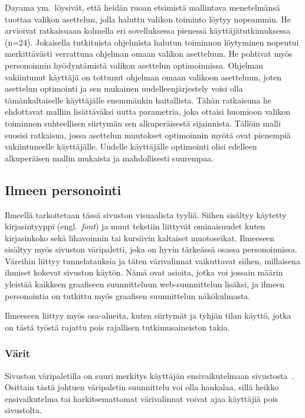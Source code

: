\documentclass[finnish, 12pt, a4paper, elec, utf8, a-1b, online]{aaltothesis}
\begin{document}
Dayama ym.~löysivät, että heidän ruoan etsimistä mallintava menetelmänsä tuottaa
valikon asettelun, jolla haluttu valikon toiminto löytyy nopeammin. He arvioivat
ratkaisuaan kolmella eri sovelluksessa pienessä käyttäjätutkimuksessa (n=24).
Jokaisella tutkituista ohjelmista halutun toiminnon löytyminen nopeutui
merkittävästi verrattuna ohjelman omaan valikon asetteluun. He pohtivat myös
personoinnin hyödyntämistä valikon asettelun optimoinnissa. Ohjelman vakiintunut
käyttäjä on tottunut ohjelman omaan valikoon asetteluun, joten asettelun
optimointi ja sen mukainen uudelleenjärjestely voisi olla tämänkaltaiselle
käyttäjälle enemmänkin haitallista. Tähän ratkaisuna he ehdottavat malliin
lisättäväksi uutta parametria, joka ottaisi huomioon valikon toiminnon
suhteellisen siirtymän sen alkuperäisestä sijainnista. Tällöin malli suosisi
ratkaisua, jossa asettelun muutokset optimoinnin myötä ovat pienempiä
vakiintuneelle käyttäjälle. Uudelle käyttäjälle optimointi olisi edelleen
alkuperäisen mallin mukaista ja mahdollisesti suurempaa.

\subsection{Ilmeen personointi}

Ilmeellä tarkoitetaan tässä sivuston visuaalista tyyliä. Siihen sisältyy
käytetty kirjasintyyppi (engl.~\textit{font}) ja muut tekstiin liittyvät
ominaisuudet kuten kirjasinkoko sekä lihavoinnin tai kursiivin kaltaiset
muotoseikat. Ilmeeseen sisältyy myös sivuston väripaletti, joka on hyvin
tärkeässä osassa personoinnissa. Väreihin liittyy tunnelatauksia ja täten
värivalinnat vaikuttavat siihen, millaisena ihmiset kokevat sivuston käytön.
Nämä ovat asioita, jotka voi jossain määrin yleistää kaikkeen graafiseen
suunnitteluun web-suunnittelun lisäksi, ja ilmeen personointia on tutkittu myös
graafisen suunnittelun näkökulmasta.

Ilmeeseen liittyy myös osa-alueita, kuten siirtymät ja tyhjän tilan käyttö,
jotka on tästä työstä rajattu pois rajallisen tutkimusaineiston takia.

\subsubsection{Värit}\label{color-personalization}

Sivuston väripaletilla on suuri merkitys käyttäjän ensivaikutelmaan
sivustosta~\cite{10.1145/2470654.2481281}. Osittain tästä johtuen väripaletin
suunnittelu voi olla hankalaa, sillä heikko ensivaikutelma tai harkitsemattomat
värivalinnat voivat ajaa käyttäjiä pois sivustolta.
\end{document}
